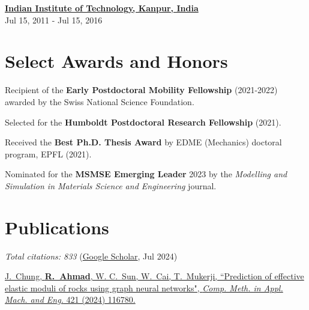 \documentclass[margin,line]{resume}
\begin{document}
\begin{resume}
    \textbf{\href{http://www.iitk.ac.in/}{\textsf{Indian Institute of Technology, Kanpur, India}}}\vspace{0mm}\\
     \hfill \small{Jul 15, 2011 - Jul 15, 2016}

    \section{\mysidestyle Select Awards and Honors}  \vspace{0mm}

    Recipient of the \textbf{Early Postdoctoral Mobility Fellowship} (2021-2022) awarded by the Swiss National Science Foundation.

    \vspace{-0.3cm}
    Selected for the \textbf{Humboldt Postdoctoral Research Fellowship} (2021).

    \vspace{-0.3cm}
    Received the \textbf{Best Ph.D. Thesis Award} by EDME (Mechanics) doctoral program, EPFL (2021).

    \vspace{-0.3cm}
    Nominated for the \textbf{MSMSE Emerging Leader} 2023 by the \textit{Modelling and Simulation in Materials Science and Engineering} journal.

    \section{\mysidestyle Publications}
    \small{\textit{Total citations: 833} (\href{https://scholar.google.ch/citations?user=ujjgd08AAAAJ&hl=en}{Google Scholar}, Jul 2024)}

    \href{https://www.sciencedirect.com/science/article/pii/S0045782524000367}{J.~Chung, \textbf{R.~Ahmad}, W. C.~Sun, W.~Cai, T.~Mukerji, ``Prediction of effective elastic moduli of rocks using graph neural networks", \textit{Comp. Meth. in Appl. Mach. and Eng.} 421 (2024) 116780.}


\end{resume}
\end{document}
